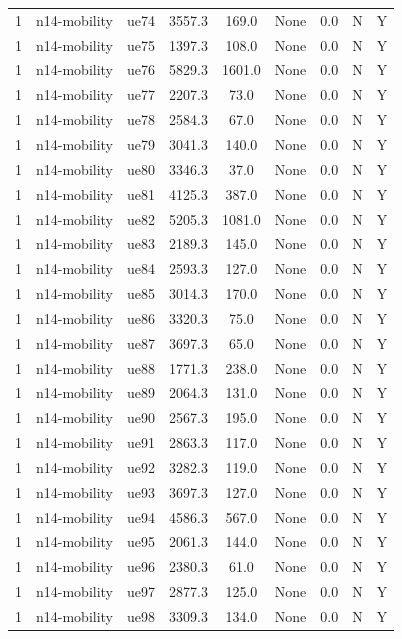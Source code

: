 \begin{table}[ht]
\begin{tabular}{|c|c|c|c|c|c|c|c|c|}
1 & n14-mobility & ue74 & 3557.3 & 169.0 & None & 0.0 & N & Y \\
1 & n14-mobility & ue75 & 1397.3 & 108.0 & None & 0.0 & N & Y \\
1 & n14-mobility & ue76 & 5829.3 & 1601.0 & None & 0.0 & N & Y \\
1 & n14-mobility & ue77 & 2207.3 & 73.0 & None & 0.0 & N & Y \\
1 & n14-mobility & ue78 & 2584.3 & 67.0 & None & 0.0 & N & Y \\
1 & n14-mobility & ue79 & 3041.3 & 140.0 & None & 0.0 & N & Y \\
1 & n14-mobility & ue80 & 3346.3 & 37.0 & None & 0.0 & N & Y \\
1 & n14-mobility & ue81 & 4125.3 & 387.0 & None & 0.0 & N & Y \\
1 & n14-mobility & ue82 & 5205.3 & 1081.0 & None & 0.0 & N & Y \\
1 & n14-mobility & ue83 & 2189.3 & 145.0 & None & 0.0 & N & Y \\
1 & n14-mobility & ue84 & 2593.3 & 127.0 & None & 0.0 & N & Y \\
1 & n14-mobility & ue85 & 3014.3 & 170.0 & None & 0.0 & N & Y \\
1 & n14-mobility & ue86 & 3320.3 & 75.0 & None & 0.0 & N & Y \\
1 & n14-mobility & ue87 & 3697.3 & 65.0 & None & 0.0 & N & Y \\
1 & n14-mobility & ue88 & 1771.3 & 238.0 & None & 0.0 & N & Y \\
1 & n14-mobility & ue89 & 2064.3 & 131.0 & None & 0.0 & N & Y \\
1 & n14-mobility & ue90 & 2567.3 & 195.0 & None & 0.0 & N & Y \\
1 & n14-mobility & ue91 & 2863.3 & 117.0 & None & 0.0 & N & Y \\
1 & n14-mobility & ue92 & 3282.3 & 119.0 & None & 0.0 & N & Y \\
1 & n14-mobility & ue93 & 3697.3 & 127.0 & None & 0.0 & N & Y \\
1 & n14-mobility & ue94 & 4586.3 & 567.0 & None & 0.0 & N & Y \\
1 & n14-mobility & ue95 & 2061.3 & 144.0 & None & 0.0 & N & Y \\
1 & n14-mobility & ue96 & 2380.3 & 61.0 & None & 0.0 & N & Y \\
1 & n14-mobility & ue97 & 2877.3 & 125.0 & None & 0.0 & N & Y \\
1 & n14-mobility & ue98 & 3309.3 & 134.0 & None & 0.0 & N & Y \\

\end{tabular}
\end{table}
